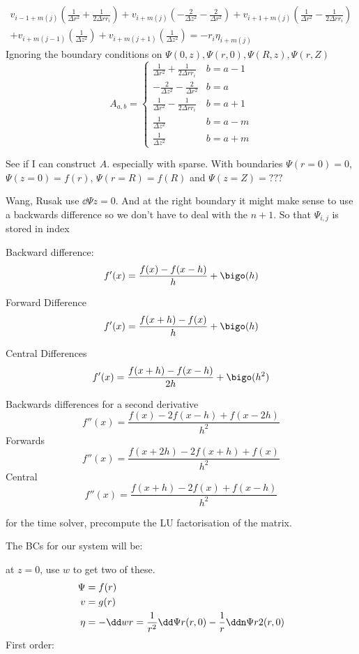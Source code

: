 \documentclass{X:/Documents/Coding/Latex/myreport}
\begin{document}
\begin{align*}
        v_{i-1+m(j)}\left(\frac{1}{\Delta r^2} + \frac{1}{2\Delta r r_i}\right) + v_{i+m(j)} \left(-\frac{2}{\Delta z^2} - \frac{2}{\Delta r^2}\right) + v_{i+1+m(j)} \left(\frac{1}{\Delta r^2} - \frac{1}{2\Delta r r_i}\right)\\
        + v_{i+m(j-1)} \left(\frac{1}{\Delta z^2}\right) + v_{i+m(j+1)}\left(\frac{1}{\Delta z^2}\right) = -r_i \eta_{i+m(j)}
\end{align*}
Ignoring the boundary conditions on $\Psi(0,z), \Psi(r,0), \Psi(R,z), \Psi(r,Z)$
\[A_{a,b} = \begin{cases}
    \frac{1}{\Delta r^2} + \frac{1}{2\Delta r r_i}  & b = a - 1 \\
    -\frac{2}{\Delta z^2} - \frac{2}{\Delta r^2}    & b = a \\
    \frac{1}{\Delta r^2} - \frac{1}{2\Delta r r_i}  & b = a + 1 \\
    \frac{1}{\Delta z^2}                            & b = a - m \\
    \frac{1}{\Delta z^2}                            & b = a + m 
\end{cases}\]

See if I can construct $A$. especially with sparse.
With boundaries $\Psi(r=0) = 0$, $\Psi(z=0) = f(r)$, $\Psi(r=R) = f(R)$ and $\Psi(z=Z) = ???$

Wang, Rusak use $\dd\Psi z = 0$. And at the right boundary it might make sense to use a backwards difference so we don't have to deal with the $n+1$.
So that $\Psi_{i,j}$ is stored in index 


Backward difference:
\[f'(x) = \frac{f(x) - f(x-h)}{h} + \bigo(h)\]

Forward Difference
\[f'(x) = \frac{f(x+h) - f(x)}{h}+ \bigo(h)\]

Central Differences
\[f'(x) = \frac{f(x+h) - f(x-h)}{2h}+ \bigo(h^2)\]

Backwards differences for a second derivative
\[f''(x) = \frac{f(x) - 2f(x-h) + f(x-2h)}{h^2}\]
Forwards
\[f''(x) = \frac{f(x+2h) - 2f(x+h) + f(x)}{h^2}\]
Central 
\[f''(x) = \frac{f(x+h) - 2 f(x) + f(x-h)}{h^2}\]


for the time solver, precompute the LU factorisation of the matrix.


The BCs for our system will be:


at $z=0$, use $w$ to get two of these.
\begin{align*}
    \Psi &= f(r)\\     
    v &= g(r)\\
    \eta &= - \dd wr = \frac{1}{r^2} \dd \Psi r (r,0) - \frac1r \ddn \Psi r2 (r,0)
\end{align*} 
First order:
\end{document}
